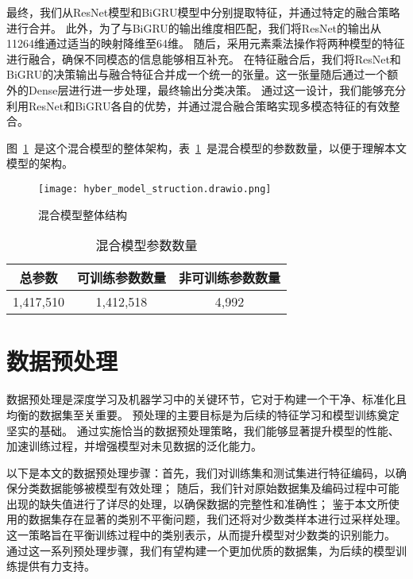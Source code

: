 最终，我们从ResNet模型和BiGRU模型中分别提取特征，并通过特定的融合策略进行合并。
此外，为了与BiGRU的输出维度相匹配，我们将ResNet的输出从11264维通过适当的映射降维至64维。
随后，采用元素乘法操作将两种模型的特征进行融合，确保不同模态的信息能够相互补充。
在特征融合后，我们将ResNet和BiGRU的决策输出与融合特征合并成一个统一的张量。这一张量随后通过一个额外的Dense层进行进一步处理，最终输出分类决策。
通过这一设计，我们能够充分利用ResNet和BiGRU各自的优势，并通过混合融合策略实现多模态特征的有效整合。

图~\ref{fig:hyber_model_struct}~是这个混合模型的整体架构，表~\ref{tab:model_params}~是混合模型的参数数量，以便于理解本文模型的架构。
\begin{figure}[htbp]
  \centering
  \texttt{[image: hyber\_model\_struction.drawio.png]}
  \caption{混合模型整体结构}
  \label{fig:hyber_model_struct}
\end{figure}



\begin{table}[htbp]
  \caption{混合模型参数数量}
  \label{tab:model_params}
  \centering
  \begin{tabular}{ccc}
    \toprule
    \textbf{总参数} & \textbf{可训练参数数量} & \textbf{非可训练参数数量}\\
    \midrule
    1,417,510 & 1,412,518 & 4,992\\
    \bottomrule
  \end{tabular}
\end{table}
\section{数据预处理}
数据预处理是深度学习及机器学习中的关键环节，它对于构建一个干净、标准化且均衡的数据集至关重要。
预处理的主要目标是为后续的特征学习和模型训练奠定坚实的基础。
通过实施恰当的数据预处理策略，我们能够显著提升模型的性能、加速训练过程，并增强模型对未见数据的泛化能力。\par

以下是本文的数据预处理步骤：首先，我们对训练集和测试集进行特征编码，以确保分类数据能够被模型有效处理；
随后，我们针对原始数据集及编码过程中可能出现的缺失值进行了详尽的处理，以确保数据的完整性和准确性；
鉴于本文所使用的数据集存在显著的类别不平衡问题，我们还将对少数类样本进行过采样处理。
这一策略旨在平衡训练过程中的类别表示，从而提升模型对少数类的识别能力。
通过这一系列预处理步骤，我们有望构建一个更加优质的数据集，为后续的模型训练提供有力支持。\par

